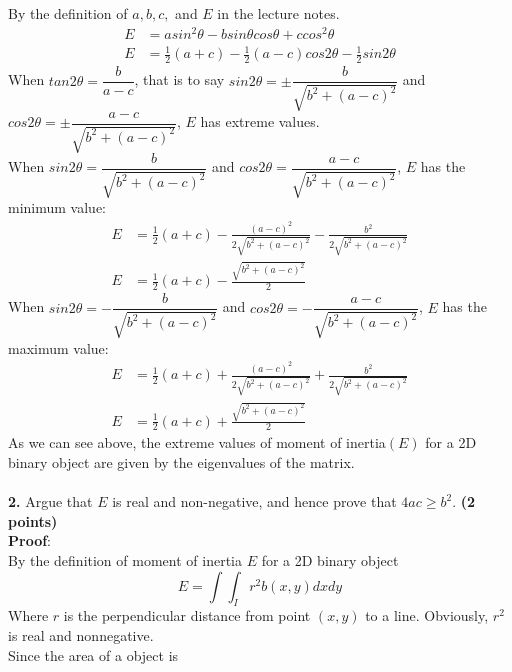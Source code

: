 \documentclass[letterpaper,flegn,12pt]{extarticle}
\begin{document}
By the definition of $a, b, c,$ and $E$ in the lecture notes.
\begin{equation}
\nonumber
\begin{aligned}
	E &= a sin^2\theta - b sin\theta cos\theta + c cos^2\theta \\
	E &= \frac{1}{2}(a+c) - \frac{1}{2}(a-c)cos2\theta - \frac{1}{2}sin2\theta
\end{aligned}
\end{equation}
When $tan2\theta = \dfrac{b}{a-c}$, that is to say $sin2\theta = \pm \dfrac{b}{\sqrt{b^2 + (a-c)^2}}$ and $cos2\theta = \pm \dfrac{a-c}{\sqrt{b^2 + (a-c)^2}}$, $E$ has extreme values. \\
When $sin2\theta = \dfrac{b}{\sqrt{b^2 + (a-c)^2}}$ and $cos2\theta = \dfrac{a-c}{\sqrt{b^2 + (a-c)^2}}$, $E$ has the minimum value:
\begin{equation}
\begin{aligned}
\nonumber E &= \frac{1}{2}(a+c) - \frac{(a-c)^2}{2\sqrt{b^2+(a-c)^2}} - \frac{b^2}{2\sqrt{b^2+(a-c)^2}} \\
E &= \frac{1}{2}(a+c) - \frac{\sqrt{b^2+(a-c)^2}}{2}
\end{aligned}
\end{equation}
When $sin2\theta = -\dfrac{b}{\sqrt{b^2 + (a-c)^2}}$ and $cos2\theta = -\dfrac{a-c}{\sqrt{b^2 + (a-c)^2}}$, $E$ has the maximum value:
\begin{equation}
\begin{aligned}
\nonumber E &= \frac{1}{2}(a+c) + \frac{(a-c)^2}{2\sqrt{b^2+(a-c)^2}} + \frac{b^2}{2\sqrt{b^2+(a-c)^2}} \\
E &= \frac{1}{2}(a+c) + \frac{\sqrt{b^2+(a-c)^2}}{2}
\end{aligned}
\end{equation}
As we can see above, the extreme values of moment of inertia$(E)$ for a 2D binary object are given by the eigenvalues of the matrix.
~\\
\\\textbf{2.} Argue that $E$ is real and non-negative, and hence prove that $4ac \geq b^2$. \textbf{(2 points)}
\\\textbf{Proof}:
\\By the definition of moment of inertia $E$ for a 2D binary object
\begin{equation}
\nonumber E = \int\int_I r^2b(x, y)dxdy
\end{equation}
Where $r$ is the perpendicular distance from point $(x, y)$ to a line. Obviously, $r^2$ is real and nonnegative.
\\ Since the area of a object is 
\end{document}
